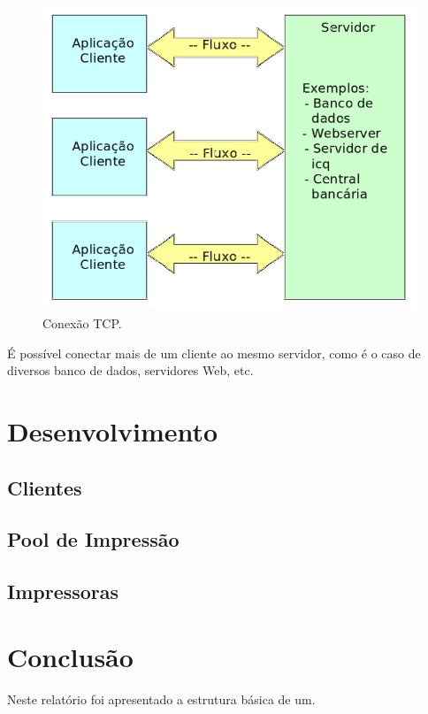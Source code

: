\documentclass[12pt]{article}
\begin{document}
\begin{figure}[H]
	\centering
	\includegraphics[scale=0.14]{imagens/fluxo.png}
	\caption{Conexão TCP.}
	\label{fluxotcp}
\end{figure} 
É possível conectar mais de um cliente ao mesmo servidor, como é o caso de diversos banco de dados, servidores Web, etc.

\section{Desenvolvimento}
\subsection{Clientes}

\subsection{Pool de Impressão}

\subsection{Impressoras}

\section{Conclusão}
Neste relatório foi apresentado a estrutura básica de um.



\end{document}
